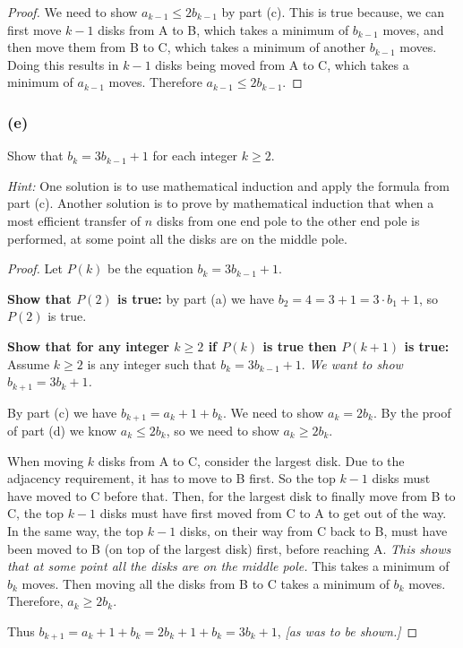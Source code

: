 \documentclass[14pt]{extarticle}
\begin{document}
\begin{proof}
    We need to show $a_{k-1} \leq 2b_{k-1}$ by part (c). This is true because, we can first move $k-1$ disks from A to B,
    which takes a minimum of $b_{k-1}$ moves, and then move them from B to C, which takes a minimum of another $b_{k-1}$
    moves. Doing this results in $k-1$ disks being moved from A to C, which takes a minimum of $a_{k-1}$ moves.
    Therefore $a_{k-1} \leq 2b_{k-1}$.
\end{proof}

\subsubsection{(e)}
Show that $b_k = 3b_{k - 1} + 1$ for each integer $k \geq 2$.

    {\it Hint:} One solution is to use mathematical induction and apply the formula from part (c). Another solution is to
prove by mathematical induction that when a most efficient transfer of $n$ disks from one end pole to the other end
pole is performed, at some point all the disks are on the middle pole.

\begin{proof}
    Let $P(k)$ be the equation $b_k = 3b_{k - 1} + 1$.

        {\bf Show that $P(2)$ is true:} by part (a) we have $b_2 = 4 = 3 + 1 = 3 \cdot b_1 + 1$, so $P(2)$ is true.

        {\bf Show that for any integer $k \geq 2$ if $P(k)$ is true then $P(k+1)$ is true:}
    Assume $k \geq 2$ is any integer such that $b_k = 3b_{k - 1} + 1$. {\it We want to show $b_{k+1} = 3b_{k} + 1$.}

    By part (c) we have $b_{k+1} = a_k + 1 + b_k$. We need to show $a_k = 2b_k$. By the proof of part (d) we know
    $a_k \leq 2b_k$, so we need to show $a_k \geq 2b_k$.

    When moving $k$ disks from A to C, consider the largest disk. Due to the adjacency requirement, it has to move to B
    first. So the top $k-1$ disks must have moved to C before that. Then, for the largest disk to finally move from B to
    C, the top $k-1$ disks must have first moved from C to A to get out of the way. In the same way, the top $k-1$ disks, on their way from C back to B, must have been moved to B (on top of the largest disk) first, before reaching A.
        {\it This shows that at some point all the disks are on the middle pole.} This takes a minimum of $b_k$ moves. Then
    moving all the disks from B to C takes a minimum of $b_k$ moves. Therefore, $a_k \geq 2b_k$.

    Thus $b_{k+1} = a_k + 1 + b_k = 2b_k + 1 + b_k = 3b_k + 1$, {\it [as was to be shown.]}
\end{proof}
\end{document}
